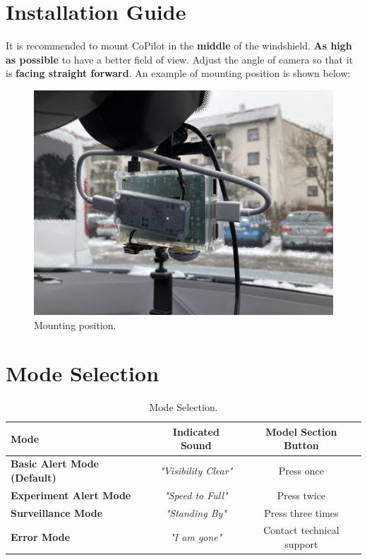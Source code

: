 \documentclass[a4paper]{manual}
\begin{document}
\section{Installation Guide}
It is recommended to mount CoPilot in the \textbf{middle} of the windshield. \textbf{As high as possible} to have a better field of view. Adjust the angle of camera so that it is \textbf{facing straight forward}.
An example of mounting position is shown below:

\begin{figure}[h!]
  \centering
  \includegraphics[width=.65\textwidth]{pics/interior}
  \caption[]{Mounting position.}
  \label{fig:front}
\end{figure}

\section{Mode Selection}


\begin{table}[h!]
\centering
\caption{\label{tab:mode}Mode Selection.}
\begin{tabular}{l|c|c}
\hline
    Mode & Indicated Sound & Model Section Button\\\hline
    \textbf{Basic Alert Mode (Default)}& \emph{"Visibility Clear"} & Press once \\\hline
    \textbf{Experiment Alert Mode} & \emph{"Speed to Full"} & Press twice \\\hline
    \textbf{Surveillance Mode} & \emph{"Standing By"} & Press three times \\\hline
    \textbf{Error Mode} & \emph{"I am gone"} & Contact technical support \\\hline
\end{tabular}
\end{table}

\newcommand{\centered}[1]{\begin{tabular}{l} #1 \end{tabular}}
\end{document}
